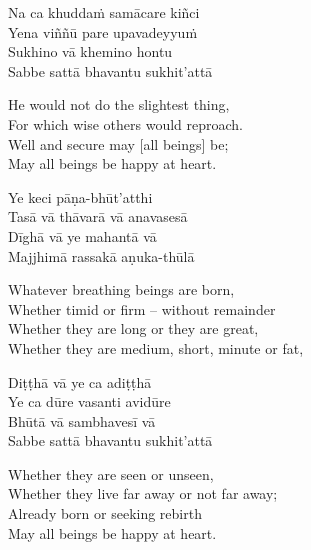 \begin{pali-hang-continued}
  Na ca khuddaṁ samācare kiñci\\
  Yena viññū pare upavadeyyuṁ\\
  Sukhino vā khemino hontu\\
  Sabbe sattā bhavantu sukhit'attā
\end{pali-hang-continued}

\begin{english-verses}
  He would not do the slightest thing,\\
  For which wise others would reproach.\\
  Well and secure may [all beings] be;\\
  May all beings be happy at heart.
\end{english-verses}

\begin{pali-hang-continued}
  Ye keci pāṇa-bhūt'atthi\\
  Tasā vā thāvarā vā anavasesā\\
  Dīghā vā ye mahantā vā\\
  Majjhimā rassakā aṇuka-thūlā
\end{pali-hang-continued}

\begin{english-verses}
  Whatever breathing beings are born,\\
  Whether timid or firm – without remainder\\
  Whether they are long or they are great,\\
  Whether they are medium, short, minute or fat,
\end{english-verses}

\begin{pali-hang-continued}
  Diṭṭhā vā ye ca adiṭṭhā\\
  Ye ca dūre vasanti avidūre\\
  Bhūtā vā sambhavesī vā\\
  Sabbe sattā bhavantu sukhit'attā
\end{pali-hang-continued}

\begin{english-verses}
  Whether they are seen or unseen,\\
  Whether they live far away or not far away;\\
  Already born or seeking rebirth\\
  May all beings be happy at heart.
\end{english-verses}

